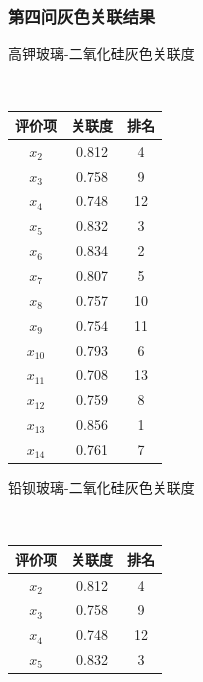 \documentclass[UTF8]{ctexart}
\begin{document}
\subsubsection*{第四问灰色关联结果}
\begin{minipage}{\textwidth}
    \begin{minipage}[t]{0.48\textwidth}
        \makeatletter{}
        \caption{高钾玻璃-二氧化硅灰色关联度}
        ~~~~~~~~~~~~~~~~\begin{tabular}{|c|c|c|}
            \hline
            评价项   & 关联度 & 排名 \\ \hline
            $x_{2}$  & 0.812  & 4    \\ \hline
            $x_{3}$  & 0.758  & 9    \\ \hline
            $x_{4}$  & 0.748  & 12   \\ \hline
            $x_{5}$  & 0.832  & 3    \\ \hline
            $x_{6}$  & 0.834  & 2    \\ \hline
            $x_{7}$  & 0.807  & 5    \\ \hline
            $x_{8}$  & 0.757  & 10   \\ \hline
            $x_{9}$  & 0.754  & 11   \\ \hline
            $x_{10}$ & 0.793  & 6    \\ \hline
            $x_{11}$ & 0.708  & 13   \\ \hline
            $x_{12}$ & 0.759  & 8    \\ \hline
            $x_{13}$ & 0.856  & 1    \\ \hline
            $x_{14}$ & 0.761  & 7    \\ \hline
        \end{tabular}
        \label{sample-table}
    \end{minipage}
    \begin{minipage}[t]{0.48\textwidth}
        \makeatletter{}
        \caption{铅钡玻璃-二氧化硅灰色关联度}
        ~~~~~~~~~~~~~~~~\begin{tabular}{|c|c|c|}
            \hline
            评价项   & 关联度 & 排名 \\ \hline
            $x_{2}$  & 0.812  & 4    \\ \hline
            $x_{3}$  & 0.758  & 9    \\ \hline
            $x_{4}$  & 0.748  & 12   \\ \hline
            $x_{5}$  & 0.832  & 3    \\ \hline

\end{tabular}
\end{minipage}
\end{minipage}
\end{document}
